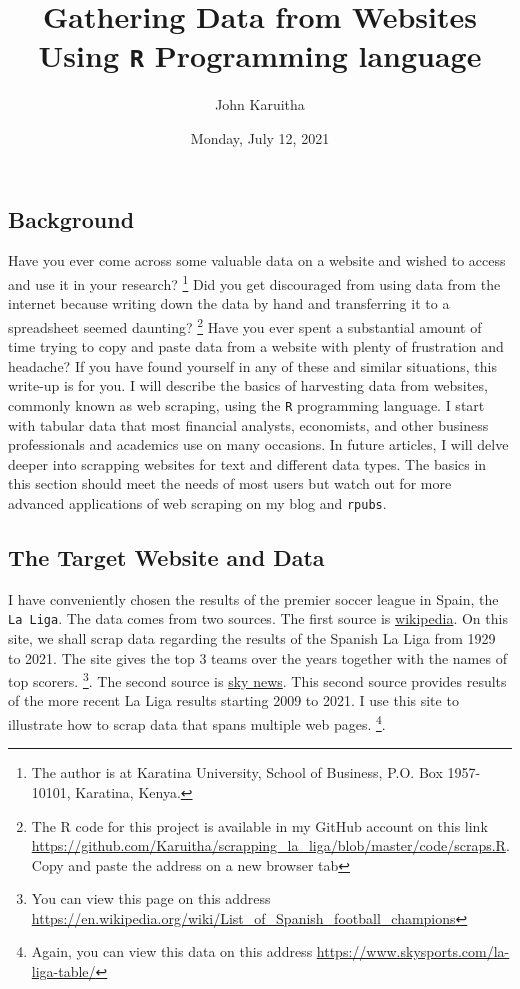 \documentclass[]{tufte-handout}
\title[Web Scrapping in R]{Gathering Data from Websites Using \texttt{R}
Programming language}
\author{John Karuitha}
\date{Monday, July 12, 2021}
\begin{document}
\maketitle




\hypertarget{background}{%
\subsection{\texorpdfstring{\textbf{Background}}{Background}}\label{background}}

Have you ever come across some valuable data on a website and wished to
access and use it in your research? \footnote{The author is at Karatina
  University, School of Business, P.O. Box 1957-10101, Karatina, Kenya.}
Did you get discouraged from using data from the internet because
writing down the data by hand and transferring it to a spreadsheet
seemed daunting? \footnote{The R code for this project is available in
  my GitHub account on this link
  \url{https://github.com/Karuitha/scrapping_la_liga/blob/master/code/scraps.R}.
  Copy and paste the address on a new browser tab} Have you ever spent a
substantial amount of time trying to copy and paste data from a website
with plenty of frustration and headache? If you have found yourself in
any of these and similar situations, this write-up is for you. I will
describe the basics of harvesting data from websites, commonly known as
web scraping, using the \texttt{R} \citep{R-base} programming language.
I start with tabular data that most financial analysts, economists, and
other business professionals and academics use on many occasions. In
future articles, I will delve deeper into scrapping websites for text
and different data types. The basics in this section should meet the
needs of most users but watch out for more advanced applications of web
scraping on my blog and \texttt{rpubs}.

\hypertarget{the-target-website-and-data}{%
\subsection{\texorpdfstring{\textbf{The Target Website and
Data}}{The Target Website and Data}}\label{the-target-website-and-data}}

I have conveniently chosen the results of the premier soccer league in
Spain, the \texttt{La\ Liga}. The data comes from two sources. The first
source is
\href{https://en.wikipedia.org/wiki/List_of_Spanish_football_champions}{wikipedia}.
On this site, we shall scrap data regarding the results of the Spanish
La Liga from 1929 to 2021. The site gives the top 3 teams over the years
together with the names of top scorers. \footnote{You can view this page
  on this address
  \url{https://en.wikipedia.org/wiki/List_of_Spanish_football_champions}}.
The second source is \href{https://www.skysports.com/la-liga-table/}{sky
news}. This second source provides results of the more recent La Liga
results starting 2009 to 2021. I use this site to illustrate how to
scrap data that spans multiple web pages. \footnote{Again, you can view
  this data on this address
  \url{https://www.skysports.com/la-liga-table/}}.
\end{document}
